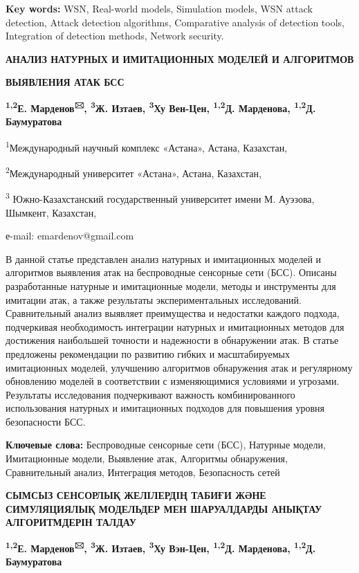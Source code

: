 {\bfseries Key words:} WSN, Real-world models, Simulation models, WSN
attack detection, Attack detection algorithms, Comparative analysis of
detection tools, Integration of detection methods, Network security.

{\bfseries АНАЛИЗ НАТУРНЫХ И ИМИТАЦИОННЫХ МОДЕЛЕЙ И АЛГОРИТМОВ}

{\bfseries ВЫЯВЛЕНИЯ АТАК БСС}

{\bfseries \textsuperscript{1,2}Е. Марденов\textsuperscript{🖂},
\textsuperscript{3}Ж. Изтаев, \textsuperscript{3}Ху Вен-Цен,
\textsuperscript{1,2}Д. Марденова, \textsuperscript{1,2}Д. Баумуратова}

\textsuperscript{1}Международный научный комплекс «Астана», Астана,
Казахстан,

\textsuperscript{2}Международный университет «Астана», Астана,
Казахстан,

\textsuperscript{3} Южно-Казахстанский государственный университет имени
М. Ауэзова, Шымкент, Казахстан,

е-mail: emardenov@gmail.com

В данной статье представлен анализ натурных и имитационных моделей и
алгоритмов выявления атак на беспроводные сенсорные сети (БСС). Описаны
разработанные натурные и имитационные модели, методы и инструменты для
имитации атак, а также результаты экспериментальных исследований.
Сравнительный анализ выявляет преимущества и недостатки каждого подхода,
подчеркивая необходимость интеграции натурных и имитационных методов для
достижения наибольшей точности и надежности в обнаружении атак. В статье
предложены рекомендации по развитию гибких и масштабируемых имитационных
моделей, улучшению алгоритмов обнаружения атак и регулярному обновлению
моделей в соответствии с изменяющимися условиями и угрозами. Результаты
исследования подчеркивают важность комбинированного использования
натурных и имитационных подходов для повышения уровня безопасности БСС.

{\bfseries Ключевые слова:} Беспроводные сенсорные сети (БСС), Натурные
модели, Имитационные модели, Выявление атак, Алгоритмы обнаружения,
Сравнительный анализ, Интеграция методов, Безопасность сетей

{\bfseries СЫМСЫЗ СЕНСОРЛЫҚ ЖЕЛІЛЕРДІҢ ТАБИҒИ ЖӘНЕ СИМУЛЯЦИЯЛЫҚ МОДЕЛЬДЕР
МЕН ШАРУАЛДАРДЫ АНЫҚТАУ АЛГОРИТМДЕРІН ТАЛДАУ}

{\bfseries \textsuperscript{1,2}Е. Марденов\textsuperscript{🖂},
\textsuperscript{3}Ж. Изтаев, \textsuperscript{3}Ху Вэн-Цен,
\textsuperscript{1,2}Д. Марденова, \textsuperscript{1,2}Д. Баумуратова}

